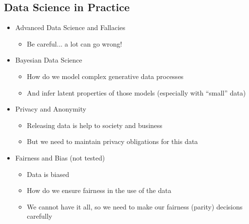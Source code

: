 \documentclass[11pt]{article}
\theoremstyle{definition}
\begin{document}
\subsection{Data Science in Practice}
\begin{itemize}
  \item Advanced Data Science and Fallacies
  \begin{itemize}
    \item Be careful... a lot can go wrong!
  \end{itemize}
  \item Bayesian Data Science
  \begin{itemize}
    \item How do we model complex generative data processes
    \item And infer latent properties of those models (especially with “small” data)
  \end{itemize}
  \item Privacy and Anonymity
  \begin{itemize}
    \item Releasing data is help to society and business
    \item But we need to maintain privacy obligations for this data
  \end{itemize}
  \item Fairness and Bias (not tested)
  \begin{itemize}
    \item Data is biased
    \item How do we ensure fairness in the use of the data
    \item We cannot have it all, so we need to make our fairness (parity) decisions carefully
  \end{itemize}
\end{itemize}
\end{document}
